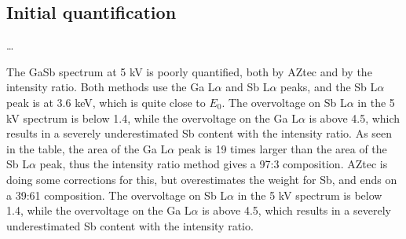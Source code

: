 



\subsection{Initial quantification}
\label{discussion:bulk_corrections:initial_quantification}

\dots

The GaSb spectrum at 5 kV is poorly quantified, both by AZtec and by the intensity ratio.
Both methods use the Ga L$\alpha$ and Sb L$\alpha$ peaks, and the Sb L$\alpha$ peak is at 3.6 keV, which is quite close to $E_0$.
The overvoltage on Sb L$\alpha$ in the 5 kV spectrum is below 1.4, while the overvoltage on the Ga L$\alpha$ is above 4.5, which results in a severely underestimated Sb content with the intensity ratio.
As seen in the table, the area of the Ga L$\alpha$ peak is 19 times larger than the area of the Sb L$\alpha$ peak, thus the intensity ratio method gives a 97:3 composition.
AZtec is doing some corrections for this, but overestimates the weight for Sb, and ends on a 39:61 composition.
The overvoltage on Sb L$\alpha$ in the 5 kV spectrum is below 1.4, while the overvoltage on the Ga L$\alpha$ is above 4.5, which results in a severely underestimated Sb content with the intensity ratio.


